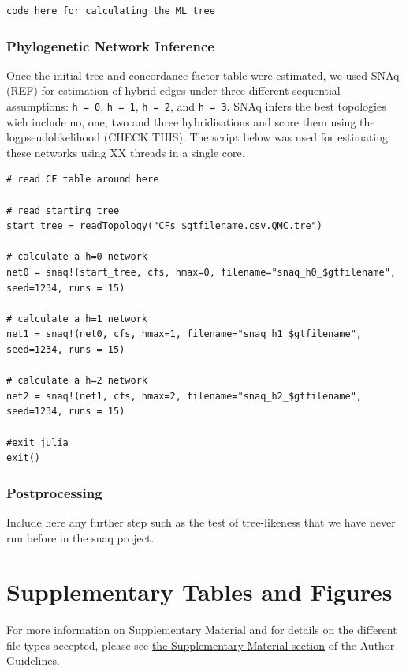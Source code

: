 \documentclass[utf8]{frontiers_suppmat} %
\begin{document}
\begin{verbatim}
code here for calculating the ML tree
\end{verbatim}

\subsubsection{Phylogenetic Network Inference}

Once the initial tree and concordance factor table were estimated, we used SNAq (REF) for estimation of hybrid edges under three different sequential assumptions: \texttt{h = 0}, \texttt{h = 1}, \texttt{h = 2}, and \texttt{h = 3}. SNAq infers the best topologies wich include no, one, two and three hybridisations and score them using the logpseudolikelihood (CHECK THIS). The script below was used for estimating these networks using XX threads in a single core.

\begin{verbatim}
# read CF table around here

# read starting tree
start_tree = readTopology("CFs_$gtfilename.csv.QMC.tre")

# calculate a h=0 network
net0 = snaq!(start_tree, cfs, hmax=0, filename="snaq_h0_$gtfilename", seed=1234, runs = 15)

# calculate a h=1 network
net1 = snaq!(net0, cfs, hmax=1, filename="snaq_h1_$gtfilename", seed=1234, runs = 15)

# calculate a h=2 network
net2 = snaq!(net1, cfs, hmax=2, filename="snaq_h2_$gtfilename", seed=1234, runs = 15)

#exit julia
exit()
\end{verbatim}

\subsubsection{Postprocessing}

Include here any further step such as the test of tree-likeness that we have never run before in the snaq project.

\section{Supplementary Tables and Figures}

For more information on Supplementary Material and for details on the different file types accepted, please see \href{http://home.frontiersin.org/about/author-guidelines#SupplementaryMaterial}{the Supplementary Material section} of the Author Guidelines.
\end{document}

